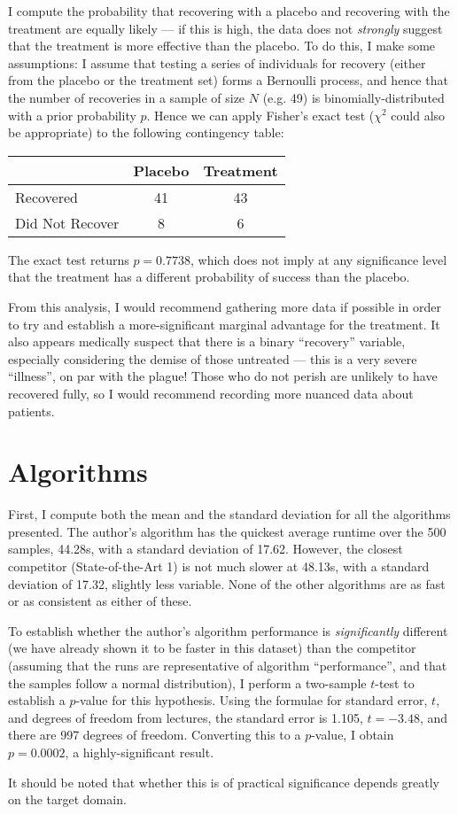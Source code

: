 \documentclass{article}
\begin{document}
I compute the probability that recovering with a placebo and recovering with the treatment are equally likely --- if this is high, the data does not \emph{strongly} suggest that the treatment is more effective than the placebo.
To do this, I make some assumptions: I assume that testing a series of individuals for recovery (either from the placebo or the treatment set) forms a Bernoulli process, and hence that the number of recoveries in a sample of size \(N\) (e.g. 49) is binomially-distributed with a prior probability \(p\).
Hence we can apply Fisher's exact test (\(\chi^2\) could also be appropriate) to the following contingency table:

\begin{center}
\begin{tabular}{l c c}
& Placebo & Treatment\\
\hline
Recovered & 41 & 43\\
Did Not Recover & 8 & 6\\
\end{tabular}
\end{center}

The exact test returns \(p = 0.7738\), which does not imply at any significance level that the treatment has a different probability of success than the placebo.

From this analysis, I would recommend gathering more data if possible in order to try and establish a more-significant marginal advantage for the treatment.
It also appears medically suspect that there is a binary ``recovery'' variable, especially considering the demise of those untreated --- this is a very severe ``illness'', on par with the plague! Those who do not perish are unlikely to have recovered fully, so I would recommend recording more nuanced data about patients.

\section{Algorithms}
First, I compute both the mean and the standard deviation for all the algorithms presented.
The author's algorithm has the quickest average runtime over the 500 samples, 44.28s, with a standard deviation of 17.62.
However, the closest competitor (State-of-the-Art 1) is not much slower at 48.13s, with a standard deviation of 17.32, slightly less variable.
None of the other algorithms are as fast or as consistent as either of these.

To establish whether the author's algorithm performance is \emph{significantly} different (we have already shown it to be faster in this dataset) than the competitor (assuming that the runs are representative of algorithm ``performance'', and that the samples follow a normal distribution), I perform a two-sample \(t\)-test to establish a \(p\)-value for this hypothesis.
Using the formulae for standard error, \(t\), and degrees of freedom from lectures, the standard error is 1.105, \(t = -3.48\), and there are 997 degrees of freedom.
Converting this to a \(p\)-value, I obtain \(p = 0.0002\), a highly-significant result.

It should be noted that whether this is of practical significance depends greatly on the target domain.
\end{document}
